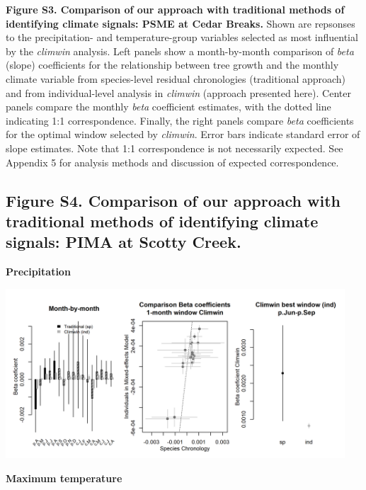 \documentclass[
]{article}
\begin{document}
\textbf{Figure S3. Comparison of our approach with traditional methods
of identifying climate signals: PSME at Cedar Breaks.} Shown are
repsonses to the precipitation- and temperature-group variables selected
as most influential by the \emph{climwin} analysis. Left panels show a
month-by-month comparison of \emph{beta} (slope) coefficients for the
relationship between tree growth and the monthly climate variable from
species-level residual chronologies (traditional approach) and from
individual-level analysis in \emph{climwin} (approach presented here).
Center panels compare the monthly \emph{beta} coefficient estimates,
with the dotted line indicating 1:1 correspondence. Finally, the right
panels compare \emph{beta} coefficients for the optimal window selected
by \emph{climwin}. Error bars indicate standard error of slope
estimates. Note that 1:1 correspondence is not necessarily expected. See
Appendix 5 for analysis methods and discussion of expected
correspondence.

\newpage

\hypertarget{figure-s4.-comparison-of-our-approach-with-traditional-methods-of-identifying-climate-signals-pima-at-scotty-creek.}{%
\subsection{Figure S4. Comparison of our approach with traditional
methods of identifying climate signals: PIMA at Scotty
Creek.}\label{figure-s4.-comparison-of-our-approach-with-traditional-methods-of-identifying-climate-signals-pima-at-scotty-creek.}}

\textbf{Precipitation}

\includegraphics[width=0.95\textwidth,height=\textheight]{tables_figures/SI_figures/traditional_comparison/climwin_vs_dcc_ScottyCreek_PIMA_pre.png}

\textbf{Maximum temperature}
\end{document}
